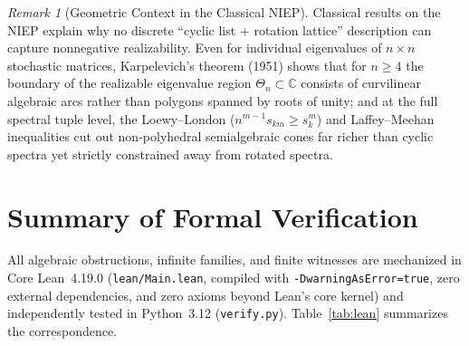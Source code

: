 \documentclass[11pt]{article}
\theoremstyle{definition}
\theoremstyle{remark}
\newtheorem{remark}[theorem]{Remark}
\begin{document}
\begin{remark}[Geometric Context in the Classical NIEP]
Classical results on the NIEP explain why no discrete ``cyclic list + rotation lattice''
description can capture nonnegative realizability. Even for individual eigenvalues of
$n \times n$ stochastic matrices, Karpelevich's theorem (1951) shows that for $n \ge 4$ the
boundary of the realizable eigenvalue region $\Theta_n \subset \mathbb{C}$ consists of
curvilinear algebraic arcs rather than polygons spanned by roots of unity; and at the full
spectral tuple level, the Loewy--London ($n^{m-1}s_{km} \ge s_k^m$) and Laffey--Meehan
inequalities cut out non-polyhedral semialgebraic cones far richer than cyclic spectra yet
strictly constrained away from rotated spectra.
\end{remark}

\section{Summary of Formal Verification}

All algebraic obstructions, infinite families, and finite witnesses are mechanized in Core
Lean~4.19.0 (\texttt{lean/Main.lean}, compiled with \texttt{-DwarningAsError=true}, zero
external dependencies, and zero axioms beyond Lean's core kernel) and independently tested
in Python~3.12 (\texttt{verify.py}). Table~\ref{tab:lean} summarizes the correspondence.
\end{document}
